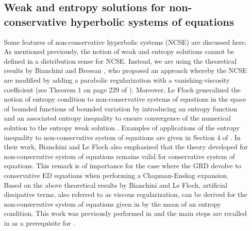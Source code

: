 \documentclass[times]{fldauth}
\begin{document}
\subsection{Weak and entropy solutions for non-conservative hyperbolic systems of equations}
\label{sec:NCSE-theorems}
%
Some features of non-conservative hyperbolic systems (NCSE) are discussed here. As mentioned previously, 
the notion of weak and entropy solutions cannot be defined in a distribution sense for NCSE. Instead, we are using the theoretical results by 
Bianchini and Bressan \cite{bianchini_bressan_2005}, who proposed an approach whereby the NCSE are modified by adding a parabolic regularization 
with a vanishing-viscosity coefficient (see Theorem 1 on page 229 of \cite{bianchini_bressan_2005}). Moreover, Le Floch generalized the notion of entropy 
condition to non-conservative systems of equations in the space of bounded functions of bounded variation by introducing an entropy function 
and an associated entropy inequality to ensure convergence of the numerical solution to the entropy weak solution \cite{lefloch_1988}. Examples of applications of the
entropy inequality to non-conservative system of equations are given in Section 4 of \cite{lefloch_1988}. In their work, Bianchini and Le Floch also emphasized that the theory developed for non-conservative system of equations remains valid for conservative system of equations. This remark is of importance for the case where the GRD devolve to conservative ED equations when performing a Chapman-Enskog expansion. Based on the above theoretical results by Bianchini and Le Floch, artificial dissipative terms, also referred to as viscous regularization, can be derived for the non-conservative system of equations given in  by the mean of an entropy condition. This work was previously performed in \cite{our_jcp_radhy_paper} and the main steps are recalled in  as a prerequisite for .
%
\end{document}
